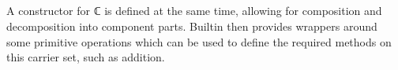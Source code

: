 \begin{AgdaMultiCode}
\begin{code}%
\>[2][@{}l@{\AgdaIndent{1}}]%
\>[4]\AgdaSpace{}%
\AgdaSpace{}%
\AgdaSymbol{:}\AgdaSpace{}%
\AgdaSpace{}%
\<%
\\
\>[4][@{}l@{\AgdaIndent{0}}]%
\>[6]\AgdaSpace{}%
\<%
\\
%
\>[6]\<%
\\
\>[6][@{}l@{\AgdaIndent{0}}]%
\>[8]%
\>[28]\AgdaSymbol{:}\AgdaSpace{}%
\<%
\\
%
\>[8]\AgdaSpace{}%
\AgdaSymbol{:}\AgdaSpace{}%
\<%
\end{code}

A constructor for ℂ is defined at the same time, allowing for composition 
and decomposition into component parts.
Builtin  then provides wrappers around some primitive operations 
which can be used to define the required methods on this carrier set,
such as addition.

\begin{code}%
%
\>[4]\AgdaOperator{\AgdaFunction{\AgdaUnderscore{}+\AgdaUnderscore{}}}\AgdaSpace{}%
\AgdaSymbol{:}\AgdaSpace{}%
\AgdaSpace{}%
\AgdaSpace{}%
\AgdaSpace{}%
\AgdaSpace{}%
\<%
\\
%
\>[4]\AgdaOperator{\AgdaFunction{\AgdaUnderscore{}+\AgdaUnderscore{}}}\AgdaSpace{}%
\AgdaSymbol{(}\AgdaSpace{}%
\AgdaOperator{\AgdaInductiveConstructor{+}}\AgdaSpace{}%
\AgdaSpace{}%
\AgdaSymbol{)}\AgdaSpace{}%
\AgdaSymbol{(}\AgdaSpace{}%
\AgdaOperator{\AgdaInductiveConstructor{+}}\AgdaSpace{}%
\AgdaSpace{}%
\AgdaSymbol{)}\<%
\\
\>[4][@{}l@{\AgdaIndent{0}}]%
\>[6]\AgdaSymbol{=}\AgdaSpace{}%
\AgdaSymbol{(}\AgdaSpace{}%
\AgdaSpace{}%
\AgdaSymbol{)}\AgdaSpace{}%
\AgdaOperator{\AgdaInductiveConstructor{+}}\AgdaSpace{}%
\AgdaSymbol{(}\AgdaSpace{}%
%
\>[54]\AgdaSymbol{)}\AgdaSpace{}%
\<%
\end{code}
\end{AgdaMultiCode}

